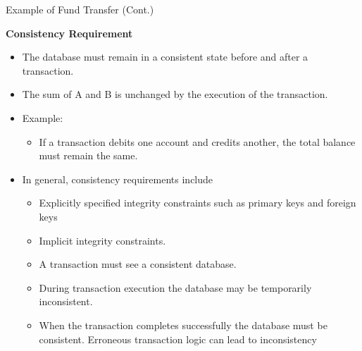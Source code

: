 \documentclass{beamer}
\begin{document}
\begin{frame}{Example of Fund Transfer (Cont.)}

    \scriptsize
    \textbf{Consistency Requirement}
    \begin{itemize}
        \item The database must remain in a consistent state before and after a transaction.
        \item The sum of A and B is unchanged by the execution of the transaction.
        \item Example:
        \begin{itemize}
            \scriptsize
            \item If a transaction debits one account and credits another, the total balance must remain the same.
        \end{itemize}
        \item In general, consistency requirements include
            \begin{itemize}
                \scriptsize
                \item Explicitly specified integrity constraints such as primary keys and foreign keys
                \item Implicit integrity constraints.
                \item A transaction must see a consistent database.
                \item During transaction execution the database may be temporarily inconsistent.
                \item When the transaction completes successfully the database must be consistent. Erroneous transaction logic can lead to inconsistency
            \end{itemize}
    \end{itemize}

\end{frame}
\end{document}
